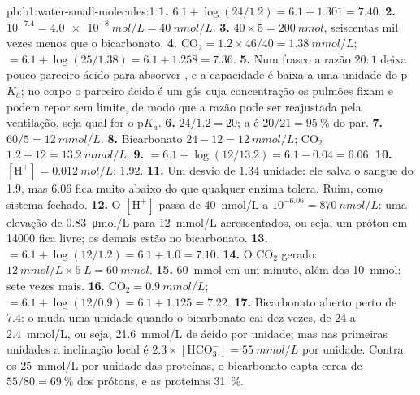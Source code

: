 \begin{solution}{pb:b1:water-small-molecules:1}
\textbf{1.} $6.1 + \log(24/1.2) = 6.1 + 1.301 = 7.40$.
\textbf{2.} $10^{-7.4} = \qty{4.0e-8}{mol/L} = \qty{40}{nmol/L}$.
\textbf{3.} $40\times 5 = \qty{200}{nmol}$, seiscentas mil vezes menos
que o bicarbonato.
\textbf{4.} $\mathrm{CO_2} = 1.2\times 46/40 = \qty{1.38}{mmol/L}$;
 $= 6.1 + \log(25/1.38) = 6.1 + 1.258 = 7.36$.
\textbf{5.} Num frasco a razão $20:1$ deixa pouco parceiro ácido para
absorver , e a capacidade é baixa a uma unidade do p$K_a$; no corpo
o parceiro ácido é um gás cuja concentração os pulmões fixam e podem
repor sem limite, de modo que a razão pode ser reajustada pela
ventilação, seja qual for o p$K_a$.
\textbf{6.} $24/1.2 = 20$; a  é $20/21 = \qty{95}{\%}$ do par.
\textbf{7.} $60/5 = \qty{12}{mmol/L}$.
\textbf{8.} Bicarbonato $24 - 12 = \qty{12}{mmol/L}$; $\mathrm{CO_2}$
$1.2 + 12 = \qty{13.2}{mmol/L}$.
\textbf{9.}  $= 6.1 + \log(12/13.2) = 6.1 - 0.04 = 6.06$.
\textbf{10.} $[\mathrm{H^+}] = \qty{0.012}{mol/L}$:  $1.92$.
\textbf{11.} Um desvio de $1.34$ unidade: ele salva o sangue do  1.9,
mas 6.06 fica muito abaixo do que qualquer enzima tolera. Ruim, como
sistema fechado.
\textbf{12.} O $[\mathrm{H^+}]$ passa de \qty{40}{nmol/L} a $10^{-6.06} = \qty{870}{nmol/L}$: uma elevação de \qty{0.83}{\micro mol/L} para \qty{12}{mmol/L} acrescentados, ou seja, um próton em \num{14000} fica livre; os demais estão no bicarbonato.
\textbf{13.}  $= 6.1 + \log(12/1.2) = 6.1 + 1.0 = 7.10$.
\textbf{14.} O $\mathrm{CO_2}$ gerado: $\qty{12}{mmol/L}\times
\qty{5}{L} = \qty{60}{mmol}$.
\textbf{15.} \qty{60}{mmol} em um minuto, além dos \qty{10}{mmol}: sete
vezes mais.
\textbf{16.} $\mathrm{CO_2} = \qty{0.9}{mmol/L}$;  $= 6.1 +
\log(12/0.9) = 6.1 + 1.125 = 7.22$.
\textbf{17.} Bicarbonato aberto perto de 7.4: o  muda uma unidade
quando o bicarbonato cai dez vezes, de \qty{24}{} a \qty{2.4}{mmol/L},
ou seja, \qty{21.6}{mmol/L} de ácido por unidade; mas nas primeiras
unidades a inclinação local é $2.3\times[\mathrm{HCO_3^-}] =
\qty{55}{mmol/L}$ por unidade. Contra os \qty{25}{mmol/L} por unidade
das proteínas, o bicarbonato capta cerca de $55/80 = \qty{69}{\%}$ dos
prótons, e as proteínas \qty{31}{\%}.

\end{solution}
